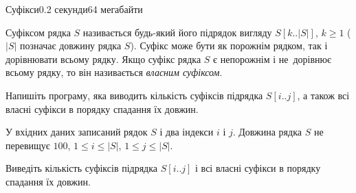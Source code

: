 \begin{problem}{Суфікси}{}{}{0.2 секунди}{64 мегабайти}

Суфіксом рядка $S$ називається будь-який його підрядок вигляду $S[k..|S|]$, $k \ge 1$ ($|S|$ позначає довжину рядка $S$). 
Суфікс може бути як порожнім рядком, так і дорівнювати всьому рядку.
Якщо суфікс рядка $S$ є непорожнім і не~дорівнює всьому рядку, то він називається {\it власним суфіксом}. 

Напишіть програму, яка виводить кількість суфіксів підрядка $S[i..j]$, а також 
всі власні суфікси в порядку спадання їх довжин.

\InputFile
У вхідних даних записаний рядок $S$ і два індекси $i$ і $j$. Довжина рядка $S$ не перевищує $100$, $1 \le i \le |S|$, $1 \le j \le |S|$.

\OutputFile
Виведіть кількість суфіксів підрядка $S[i..j]$
і всі власні суфікси в порядку спадання їх довжин.

\Examples

\begin{example}
%
%
\end{example}

\end{problem}

